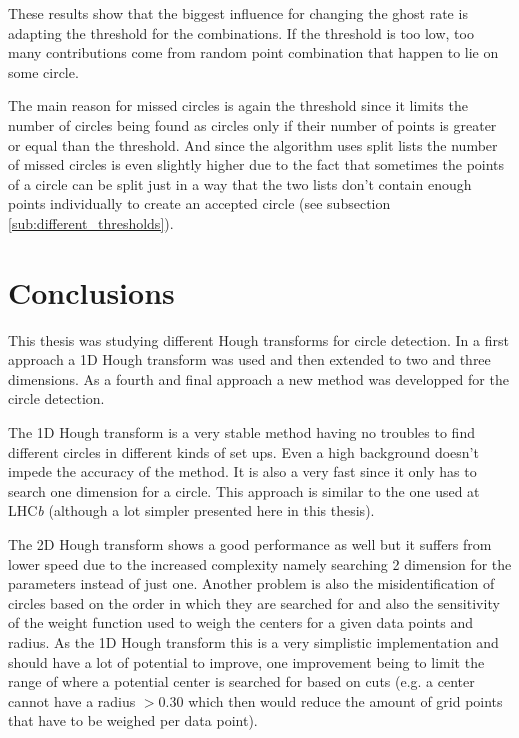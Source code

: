\documentclass[11pt,twoside]{scrreprt}
\begin{document}
These results show that the biggest influence for changing the ghost rate is adapting the
threshold for the combinations. If the threshold is too low, too many contributions come from
random point combination that happen to lie on some circle.

The main reason for missed circles is again the threshold since it limits the number of circles
being found as circles only if their number of points is greater or equal than the threshold. And
since the algorithm uses split lists the number of missed circles is even slightly higher due to the
fact that sometimes the points of a circle can be split just in a way that the two lists don't
contain enough points individually to create an accepted circle (see subsection \ref{sub:different_thresholds}).




\chapter{Conclusions} %
\label{cha:conclusions}

This thesis was studying different Hough transforms for circle detection. In a first approach a 1D Hough transform was used and then extended to two and three
dimensions.
As a fourth and final approach a new method was developped for the circle detection. 

The 1D Hough transform is a very stable method having no troubles to find different circles in different kinds of set ups. Even a high background
doesn't impede the accuracy of the method. It is also a very fast since it only has to search one dimension for a circle.
This approach is similar to the one used at LHC\textit{b} (although a lot simpler presented here in this thesis).

The 2D Hough transform shows a good performance as well but it suffers from lower speed due to the increased complexity namely searching
2 dimension for the parameters instead of just one. Another problem is also the misidentification of circles based on the order in which
they are searched for and also the sensitivity of the weight function used to weigh the centers for a given data points and radius.
As the 1D Hough transform this is a very simplistic implementation and should have a lot of potential to improve, one improvement being to
limit the range of where a potential center is searched for based on cuts (e.g. a center cannot have a radius $>0.30$ which then would reduce
the amount of grid points that have to be weighed per data point).
\end{document}
